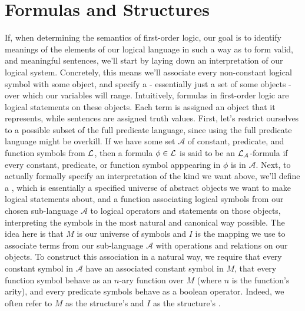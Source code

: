 \documentclass{article}
\begin{document}
\section{Formulas and Structures}
If, when determining the semantics of first-order logic, our goal is to identify meanings of the elements of our logical language in such a way as to form valid, and meaningful sentences, we'll start by laying down an interpretation of our logical system. Concretely, this means we'll associate every non-constant logical symbol with some object, and specify a  - essentially just a set of some objects - over which our variables will range. Intuitively, formulas in first-order logic are logical statements on these objects. Each term is assigned an object that it represents, while sentences are assigned truth values.
\nn
First, let's restrict ourselves to a possible subset of the full predicate language, since using the full predicate language might be overkill. If we have some set $ \mathcal{A} $ of constant, predicate, and function symbols from $ \mathcal{L} $, then a formula $ \phi \in \mathcal{L} $ is said to be an $ \mathcal{L}_{\mathcal{A}} $-formula if every constant, predicate, or function symbol apppearing in $ \phi $ is in $ \mathcal{A} $. Next, to actually formally specify an interpretation of the kind we want above, we'll define a , which is essentially a specified universe of abstract objects we want to make logical statements about, and a function associating logical symbols from our chosen sub-language $ \mathcal{A} $ to logical operators and statements on those objects, interpreting the symbols in the most natural and canonical way possible.
\n
The idea here is that $ M $ is our universe of symbols and $ I $ is the mapping we use to associate terms from our sub-language $ \mathcal{A} $ with operations and relations on our objects. To construct this association in a natural way, we require that every constant symbol in $ \mathcal{A} $ have an associated constant symbol in $ M $, that every function symbol behave as an $ n $-ary function over $ M $ (where $ n $ is the function's arity), and every predicate symbols behave as a boolean operator. Indeed, we often refer to $ M $ as the structure's  and $ I $ as the structure's .
\end{document}
